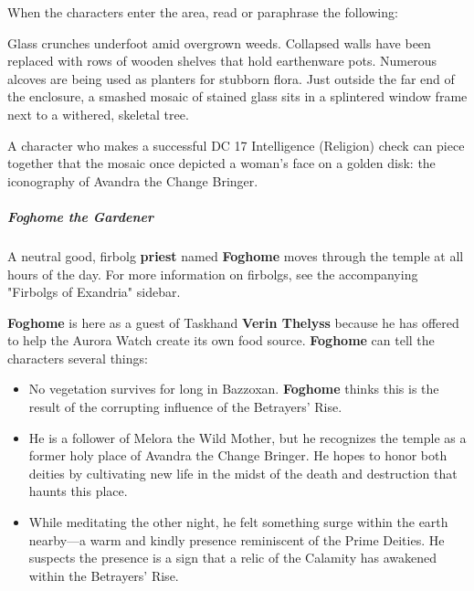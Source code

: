 \documentclass[10pt,a4paper,twoside,bg=print,twocolumn,openany,nodeprecatedcode]{dndbook}
\begin{document}
When the characters enter the area, read or paraphrase the following:

\begin{DndReadAloud}{}
Glass crunches underfoot amid overgrown weeds. Collapsed walls have been replaced with rows of wooden shelves that hold earthenware pots. Numerous alcoves are being used as planters for stubborn flora. Just outside the far end of the enclosure, a smashed mosaic of stained glass sits in a splintered window frame next to a withered, skeletal tree.

\end{DndReadAloud}

A character who makes a successful DC 17 Intelligence (Religion) check can piece together that the mosaic once depicted a woman's face on a golden disk: the iconography of Avandra the Change Bringer.

\subparagraph{Foghome the Gardener}
A neutral good, firbolg \textbf{priest} named \textbf{Foghome} moves through the temple at all hours of the day. For more information on firbolgs, see the accompanying "Firbolgs of Exandria" sidebar.

\textbf{Foghome} is here as a guest of Taskhand \textbf{Verin Thelyss} because he has offered to help the Aurora Watch create its own food source. \textbf{Foghome} can tell the characters several things:


\begin{itemize}
\item No vegetation survives for long in Bazzoxan. \textbf{Foghome} thinks this is the result of the corrupting influence of the Betrayers' Rise.
\item He is a follower of Melora the Wild Mother, but he recognizes the temple as a former holy place of Avandra the Change Bringer. He hopes to honor both deities by cultivating new life in the midst of the death and destruction that haunts this place.
\item While meditating the other night, he felt something surge within the earth nearby—a warm and kindly presence reminiscent of the Prime Deities. He suspects the presence is a sign that a relic of the Calamity has awakened within the Betrayers' Rise.
\end{itemize}
\end{document}
